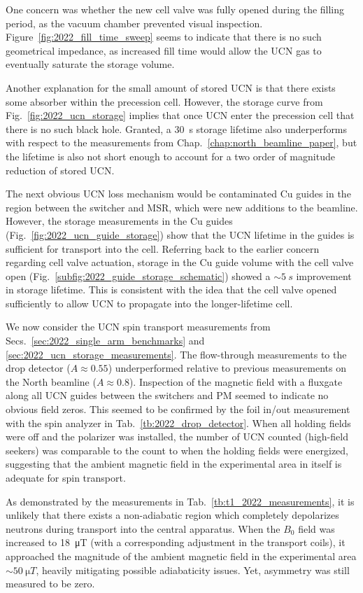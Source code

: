 One concern was whether the new cell valve was fully opened during the filling period, as the vacuum chamber prevented visual inspection. Figure~\ref{fig:2022_fill_time_sweep} seems to indicate that there is no such geometrical impedance, as increased fill time would allow the UCN gas to eventually saturate the storage volume.

Another explanation for the small amount of stored UCN is that there exists some absorber within the precession cell. However, the storage curve from Fig.~\ref{fig:2022_ucn_storage} implies that once UCN enter the precession cell that there is no such black hole. Granted, a \qty{30}{s} storage lifetime also underperforms with respect to the measurements from Chap.~\ref{chap:north_beamline_paper}, but the lifetime is also not short enough to account for a two order of magnitude reduction of stored UCN.

The next obvious UCN loss mechanism would be contaminated Cu guides in the region between the switcher and MSR, which were new additions to the beamline. However, the storage measurements in the Cu guides  (Fig.~\ref{fig:2022_ucn_guide_storage}) show that the UCN lifetime in the guides is sufficient for transport into the cell. Referring back to the earlier concern regarding cell valve actuation, storage in the Cu guide volume with the cell valve open (Fig.~\ref{subfig:2022_guide_storage_schematic}) showed a $\sim \qty{5}{s}$ improvement in storage lifetime. This is consistent with the idea that the cell valve opened sufficiently to allow UCN to propagate into the longer-lifetime cell.

We now consider the UCN spin transport measurements from Secs.~\ref{sec:2022_single_arm_benchmarks} and \ref{sec:2022_ucn_storage_measurements}. The flow-through measurements to the drop detector ($A\approx 0.55$) underperformed relative to previous measurements on the North beamline  ($A\approx 0.8$). Inspection of the magnetic field with a fluxgate along all UCN guides between the switchers and PM seemed to indicate no obvious field zeros. This seemed to be confirmed by the foil in/out measurement with the spin analyzer in Tab.~\ref{tb:2022_drop_detector}. When all holding fields were off and the polarizer was installed, the number of UCN counted (high-field seekers) was comparable to the count to when the holding fields were energized, suggesting that the ambient magnetic field in the experimental area in itself is adequate for spin transport.

As demonstrated by the measurements in Tab.~\ref{tb:t1_2022_measurements}, it is unlikely that there exists a non-adiabatic region which completely depolarizes neutrons during transport into the central apparatus. When the $B_0$ field was increased to \qty{18}{\micro T} (with a corresponding adjustment in the transport coils), it approached the magnitude of the ambient magnetic field in the experimental area $\sim\qty{50}{\micro T}$, heavily mitigating possible adiabaticity issues. Yet, asymmetry was still measured to be zero.

